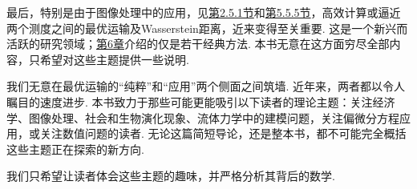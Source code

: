 最后，特别是由于图像处理中的应用，见\hyperref[sec:2.5.1]{第2.5.1节}和\hyperref[sec:5.5.5]{第5.5.5节}，高效计算或逼近两个测度之间的最优运输及Wasserstein距离，近来变得至关重要. 这是一个新兴而活跃的研究领域；\hyperref[sec:6]{第6章}介绍的仅是若干经典方法. 本书无意在这方面穷尽全部内容，只希望对这些主题提供一些说明.

我们无意在最优运输的“纯粹”和“应用”两个侧面之间筑墙. 近年来，两者都以令人瞩目的速度进步. 本书致力于那些可能更能吸引以下读者的理论主题：关注经济学、图像处理、社会和生物演化现象、流体力学中的建模问题，关注偏微分方程应用，或关注数值问题的读者. 无论这篇简短导论，还是整本书，都不可能完全概括这些主题正在探索的新方向.

我们只希望让读者体会这些主题的趣味，并严格分析其背后的数学.
